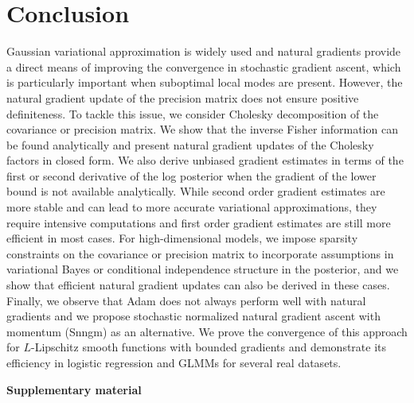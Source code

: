 \documentclass{statsoc}
\begin{document}
\section{Conclusion} \label{sec_Conclusion}
Gaussian variational approximation is widely used and natural gradients provide a direct means of improving the convergence in stochastic gradient ascent, which is particularly important when suboptimal local modes are present. However, the natural gradient update of the precision matrix does not ensure positive definiteness. To tackle this issue, we consider Cholesky decomposition of the covariance or precision matrix. We show that the inverse Fisher information can be found analytically and present natural gradient updates of the Cholesky factors in closed form. We also derive unbiased gradient estimates in terms of the first or second derivative of the log posterior when the gradient of the lower bound is not available analytically. While second order gradient estimates are more stable and can lead to more accurate variational approximations, they require intensive computations and first order gradient estimates are still more efficient in most cases. For high-dimensional models, we impose sparsity constraints on the covariance or precision matrix to incorporate assumptions in variational Bayes or conditional independence structure in the posterior, and we show that efficient natural gradient updates can also be derived in these cases. Finally, we observe that Adam does not always perform well with natural gradients and we propose stochastic normalized natural gradient ascent with momentum (Snngm) as an alternative. We prove the convergence of this approach for $L$-Lipschitz smooth functions with bounded gradients and demonstrate its efficiency in logistic regression and GLMMs for several real datasets.


\vskip 0.2in





\newpage

\setcounter{section}{0} \renewcommand{\thesection}{S\arabic{section}}
\setcounter{figure}{0} \renewcommand{\thefigure}{S\arabic{figure}}
\setcounter{table}{0} \renewcommand{\thetable}{S\arabic{table}}
\setcounter{equation}{0} \renewcommand{\theequation}{S\arabic{equation}}
\setcounter{lemma}{0} \renewcommand{\thelemma}{S\arabic{lemma}}



\noindent
{\bf \Large Supplementary material}
\end{document}
